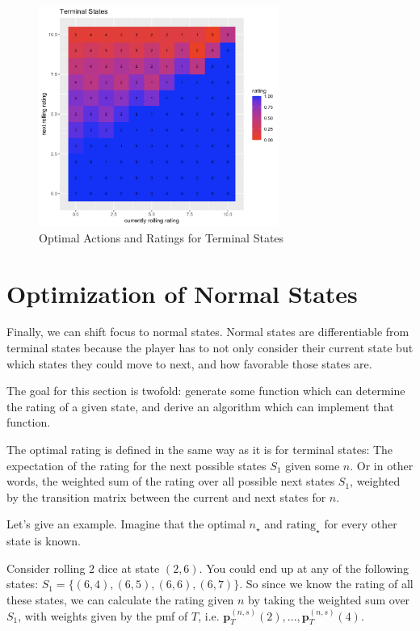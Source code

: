 \documentclass[a4paper]{article}
\begin{document}
\begin{figure}[h]
    \centering
    \includegraphics[width=0.7\textwidth]{Screenshot 2023-12-12 at 20.21.12.png}
    \caption{Optimal Actions and Ratings for Terminal States}
\end{figure}


\section{Optimization of Normal States}

Finally, we can shift focus to normal states. Normal states are differentiable from terminal states because the player has to not only consider their current state but which states they could move to next, and how favorable those states are. 

The goal for this section is twofold: generate some function which can determine the rating of a given state, and derive an algorithm which can implement that function. 

The optimal rating is defined in the same way as it is for terminal states: The expectation of the rating for the next possible states $S_1$ given some $n$. Or in other words, the weighted sum of the rating over all possible next states $S_1$, weighted by the transition matrix between the current and next states for $n$. 

Let's give an example. Imagine that the optimal $n_{\star}$ and $\text{rating}_{\star}$ for every other state is known. 

Consider rolling $2$ dice at state $(2, 6)$. You could end up at any of the following states: $S_1 = \{(6, 4), (6,5), (6,6), (6,7)\}$. So since we know the rating of all these states, we can calculate the rating given $n$ by taking the weighted sum over $S_1$, with weights given by the pmf of $T$, i.e. $\textbf{p}_{T}^{(n, s)}(2), \ldots, \textbf{p}_{T}^{(n, s)}(4)$.
\end{document}
